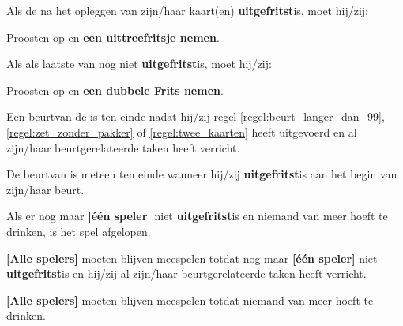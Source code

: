 \vervolgLijst{}
    \item Als de \huidigeSpeler na het opleggen van zijn/haar kaart(en) \textbf{uitgefritst}\footnotemark[4] is, moet hij/zij:
    \puntLijst{}
        \item Proosten op  en \textbf{een uittreefritsje nemen}\footnotemark[3].
    \eindPuntLijst{}
    \label{regel:laatste_frits_2}
\eindLijst{}

\vervolgLijst{}
    \item Als \eenSpeler als laatste van \alleSpelers nog niet \textbf{uitgefritst}\footnotemark[2] is, moet hij/zij:
    \puntLijst{}
        \item Proosten op  en \textbf{een dubbele Frits nemen}\footnotemark[4].
    \eindPuntLijst{}
\eindLijst{}


\vervolgLijst{}
    \item Een beurt\footnotemark[1] van de \huidigeSpeler is ten einde nadat hij/zij  regel \ref{regel:beurt_langer_dan_99}, \ref{regel:zet_zonder_pakker} of \ref{regel:twee_kaarten} heeft uitgevoerd en al zijn/haar beurtgerelateerde taken heeft verricht.
\eindLijst{}

\vervolgLijst{}
    \item De beurt\footnotemark[1] van \eenSpeler is meteen ten einde wanneer hij/zij \textbf{uitgefritst}\footnotemark[2] is aan het begin van zijn/haar beurt. 
\eindLijst{}

\vervolgLijst{}
    \item Als er nog maar \textbf{[\'e\'en speler]} niet \textbf{uitgefritst}\footnotemark[2] is en niemand van \alleSpelers meer hoeft te drinken, is het spel afgelopen.
\eindLijst{}

\vervolgLijst{}
    \item \textbf{[Alle spelers]} moeten blijven meespelen totdat nog maar \textbf{[één speler]} niet \textbf{uitgefritst}\footnotemark[3] is en hij/zij al zijn/haar beurtgerelateerde taken heeft verricht.
\eindLijst{}  

\vervolgLijst{}
    \item \textbf{[Alle spelers]} moeten blijven meespelen totdat niemand van \alleSpelers meer hoeft te drinken.
\eindLijst{} 




